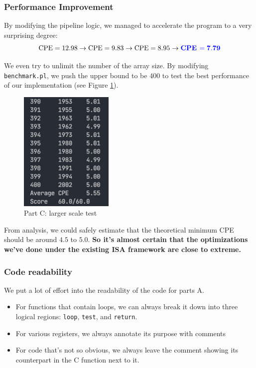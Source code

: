 \documentclass[12pt,a4paper]{article}
\begin{document}
\subsubsection{Performance Improvement}
By modifying the pipeline logic, we managed to accelerate the program to a very surprising degree:
$$
        \text{CPE} = 12.98 \rightarrow \text{CPE} = 9.83 \rightarrow \text{CPE} = 8.95 \rightarrow {\color{blue}\textbf{CPE }\mathbf{= 7.79}}
$$

We even try to unlimit the number of the array size. By modifying \texttt{benchmark.pl}, 
we push the upper bound to be 400 to test the best performance of our implementation (see Figure \ref{Fig.partC-limit}).
\begin{figure}[H] %
        \centering %
        \includegraphics[width=0.4\textwidth]{partC-larger-scale-test.jpg} %
        \caption{Part C: larger scale test} %
        \label{Fig.partC-limit} %
\end{figure}
From analysis, we could safely estimate that the theoretical minimum CPE should be around $4.5$ to $5.0$. \textbf{So it's almost certain that the optimizations we've done under the existing ISA framework are close to extreme.}
\subsubsection{Code readability}
We put a lot of effort into the readability of the code for parts A.
\begin{itemize}
        \item For functions that contain loops, we can always break it down into three logical regions: \texttt{loop}, \texttt{test}, and \texttt{return}.
        \item For various registers, we always annotate its purpose with comments
        \item For code that's not so obvious, we always leave the comment showing its counterpart in the C function next to it.
\end{itemize}
\end{document}
